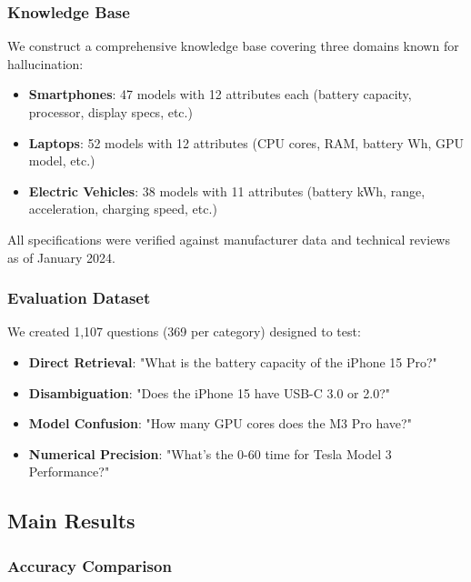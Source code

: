 \documentclass[11pt, a4paper]{article}
\theoremstyle{definition}
\begin{document}
\subsubsection{Knowledge Base}

We construct a comprehensive knowledge base covering three domains known for hallucination:

\begin{itemize}
    \item \textbf{Smartphones}: 47 models with 12 attributes each (battery capacity, processor, display specs, etc.)
    \item \textbf{Laptops}: 52 models with 12 attributes (CPU cores, RAM, battery Wh, GPU model, etc.)
    \item \textbf{Electric Vehicles}: 38 models with 11 attributes (battery kWh, range, acceleration, charging speed, etc.)
\end{itemize}

All specifications were verified against manufacturer data and technical reviews as of January 2024.

\subsubsection{Evaluation Dataset}

We created 1,107 questions (369 per category) designed to test:
\begin{itemize}
    \item \textbf{Direct Retrieval}: "What is the battery capacity of the iPhone 15 Pro?"
    \item \textbf{Disambiguation}: "Does the iPhone 15 have USB-C 3.0 or 2.0?" 
    \item \textbf{Model Confusion}: "How many GPU cores does the M3 Pro have?"
    \item \textbf{Numerical Precision}: "What's the 0-60 time for Tesla Model 3 Performance?"
\end{itemize}

\subsection{Main Results}

\subsubsection{Accuracy Comparison}
\end{document}
